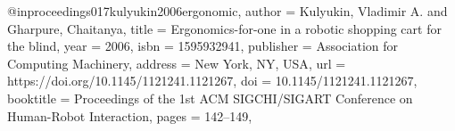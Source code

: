 @inproceedings{017kulyukin2006ergonomic,
author = {Kulyukin, Vladimir A. and Gharpure, Chaitanya},
title = {Ergonomics-for-one in a robotic shopping cart for the blind},
year = {2006},
isbn = {1595932941},
publisher = {Association for Computing Machinery},
address = {New York, NY, USA},
url = {https://doi.org/10.1145/1121241.1121267},
doi = {10.1145/1121241.1121267},
booktitle = {Proceedings of the 1st ACM SIGCHI/SIGART Conference on Human-Robot Interaction},
pages = {142–149},
}